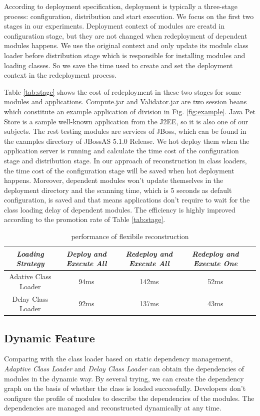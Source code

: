 \documentclass[conference]{IEEEtran}
\begin{document}
According to deployment specification\cite{jsr88}, deployment is typically a three-stage process: configuration, distribution and start execution.
We focus on the first two stages in our experiments.
Deployment context of modules are creatd in configuration stage, but they are not changed when redeployment of dependent modules happens.
We use the original context and only update its module class loader before distribution stage which is responsible for installing modules and loading classes.
So we save the time used to create and set the deployment context in the redeployment process.

Table \ref{tab:stage} shows the cost of redeployment in these two stages for some modules and applications.
Compute.jar and Validator.jar are two session beans which constitute an example application of division in Fig. \ref{fig:example}.
Java Pet Store\cite{java_pet_store} is a sample well-known application from the J2EE\cite{j2ee}, so it is also one of our subjects.
The rest testing modules are services of JBoss, which can be found in the examples directory of JBossAS 5.1.0 Release.
We hot deploy them when the application server is running and calculate the time cost of the configuration stage and distribution stage.
In our approach of reconstruction in class loaders, the time cost of the configuration stage will be saved when hot deployment happens.
Moreover, dependent modules won't update themselves in the deployment directory and the scanning time, which is 5 seconds as default configuration, is saved and that means applications don't require to wait for the class loading delay of dependent modules. 
The efficiency is highly improved according to the promotion rate of Table \ref{tab:stage}.

\begin{table}
\centering
\caption{performance of flexibile reconstruction}
\label{tab:flexibility}
\begin{tabular}{|c|c|c|c|c|}
\hline
\emph{Loading Strategy}	& \emph{Deploy and Execute All}	& \emph{Redeploy and Execute All} & \emph{Redeploy and Execute One}\\
\hline
\hline
Adative Class Loader 	&	94ms				&	142ms				&	52ms\\
\hline
Delay Class Loader 	&	92ms				&	137ms				&	43ms\\
\hline
\end{tabular}
\end{table}


\subsection{Dynamic Feature}
Comparing with the class loader based on static dependency management, \emph{Adaptive Class Loader} and \emph{Delay Class Loader} can obtain the dependencies of modules in the dynamic way.
By several trying, we can create the dependency graph on the basis of whether the class is loaded successfully.
Developers don't configure the profile of modules to describe the dependencies of the modules.
The dependencies are managed and reconstructed dynamically at any time.
\end{document}
